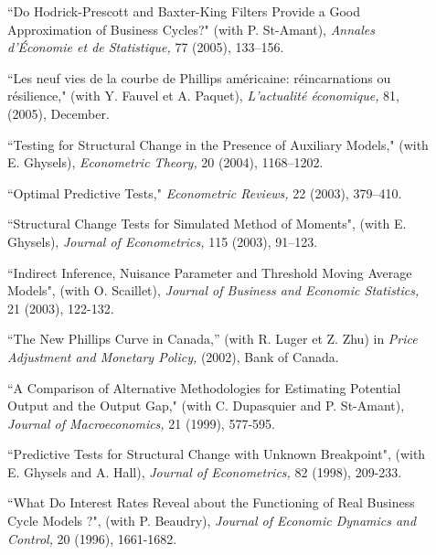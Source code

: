 \begin{description}
\item[] ``Do Hodrick-Prescott and Baxter-King Filters
Provide a Good Approximation of Business Cycles?" (with P.
St-Amant), {\it Annales d'\'Economie et de Statistique,} 77 (2005),
133--156.


\item[] ``Les neuf vies de la courbe de Phillips
am\'ericaine: r\'eincarnations ou r\'esilience," (with Y. Fauvel et
A. Paquet), {\it L'actualit\'e \'economique,} 81, (2005), December.

\item[] ``Testing for Structural Change in the Presence of
Auxiliary Models," (with E. Ghysels), {\it Econometric Theory,} 20
(2004), 1168--1202.

\item[] ``Optimal Predictive Tests," {\it
Econometric Reviews,} 22 (2003), 379--410.

\item[] ``Structural Change Tests for Simulated
Method of Moments", (with E. Ghysels), {\it Journal of
Econometrics,} 115 (2003), 91--123.

\item[] ``Indirect Inference, Nuisance Parameter and
Threshold Moving Average Models", (with O. Scaillet), {\it Journal of Business and Economic Statistics,} 21 (2003), 122-132.

\item[] ``The New Phillips Curve in Canada,''
(with R. Luger et Z. Zhu) in {\it Price Adjustment and Monetary Policy,} (2002), Bank of Canada.

\item[] ``A Comparison of Alternative Methodologies for Estimating Potential Output and the Output Gap," (with C. Dupasquier and P. St-Amant), {\it Journal of Macroeconomics,}  21 (1999), 577-595.

\item[] ``Predictive Tests for Structural
Change with Unknown Breakpoint", (with E. Ghysels and A. Hall), {\it Journal of Econometrics,} 82 (1998), 209-233.

\item[] ``What Do Interest Rates Reveal about the
Functioning of Real Business Cycle Models ?", (with P. Beaudry), {\it Journal of Economic Dynamics and Control,} 20 (1996), 1661-1682.

\end{description}

\vspace{.5cm}


